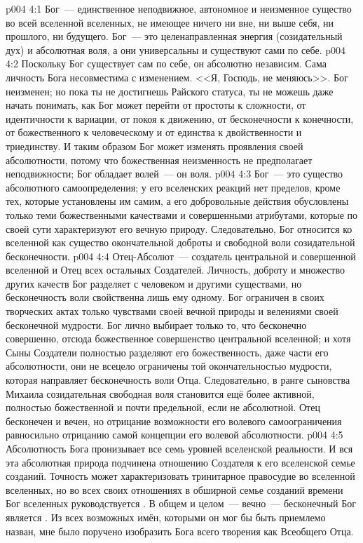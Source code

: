\vs p004 4:1 Бог~--- единственное неподвижное, автономное и неизменное существо во всей вселенной вселенных, не имеющее ничего ни вне, ни выше себя, ни прошлого, ни будущего. Бог~--- это целенаправленная энергия (созидательный дух) и абсолютная воля, а они универсальны и существуют сами по себе.
\vs p004 4:2 Поскольку Бог существует сам по себе, он абсолютно независим. Сама личность Бога несовместима с изменением. <<Я, Господь, не меняюсь>>. Бог неизменен; но пока ты не достигнешь Райского статуса, ты не можешь даже начать понимать, как Бог может перейти от простоты к сложности, от идентичности к вариации, от покоя к движению, от бесконечности к конечности, от божественного к человеческому и от единства к двойственности и триединству. И таким образом Бог может изменять проявления своей абсолютности, потому что божественная неизменность не предполагает неподвижности; Бог обладает волей~--- он  воля.
\vs p004 4:3 Бог~--- это существо абсолютного самоопределения; у его вселенских реакций нет пределов, кроме тех, которые установлены им самим, а его добровольные действия обусловлены только теми божественными качествами и совершенными атрибутами, которые по своей сути характеризуют его вечную природу. Следовательно, Бог относится ко вселенной как существо окончательной доброты и свободной воли созидательной бесконечности.
\vs p004 4:4 Отец\hyp{}Абсолют~--- создатель центральной и совершенной вселенной и Отец всех остальных Создателей. Личность, доброту и множество других качеств Бог разделяет с человеком и другими существами, но бесконечность воли свойственна лишь ему одному. Бог ограничен в своих творческих актах только чувствами своей вечной природы и велениями своей бесконечной мудрости. Бог лично выбирает только то, что бесконечно совершенно, отсюда божественное совершенство центральной вселенной; и хотя Сыны Создатели полностью разделяют его божественность, даже части его абсолютности, они не всецело ограничены той окончательностью мудрости, которая направляет бесконечность воли Отца. Следовательно, в ранге сыновства Михаила созидательная свободная воля становится ещё более активной, полностью божественной и почти предельной, если не абсолютной. Отец бесконечен и вечен, но отрицание возможности его волевого самоограничения равносильно отрицанию самой концепции его волевой абсолютности.
\vs p004 4:5 \pc Абсолютность Бога пронизывает все семь уровней вселенской реальности. И вся эта абсолютная природа подчинена отношению Создателя к его вселенской семье созданий. Точность может характеризовать тринитарное правосудие во вселенной вселенных, но во всех своих отношениях в обширной семье созданий времени Бог вселенных руководствуется . В общем и целом~--- вечно~--- бесконечный Бог является . Из всех возможных имён, которыми он мог бы быть приемлемо назван, мне было поручено изобразить Бога всего творения как Всеобщего Отца.
